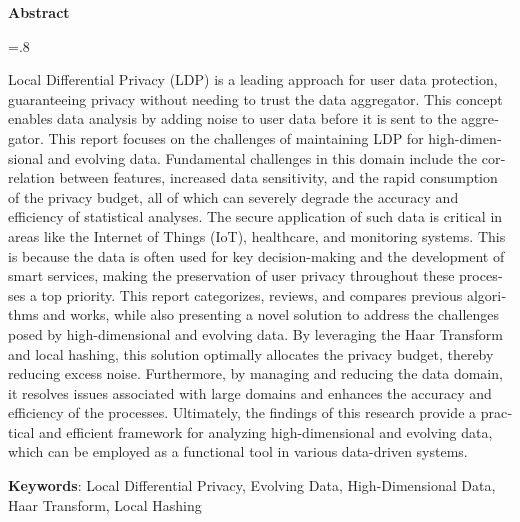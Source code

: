 

\begin{latin}

\begin{center}
\textbf{Abstract}
\end{center}
\baselineskip=.8\baselineskip

Local Differential Privacy (LDP) is a leading approach for user data protection, guaranteeing privacy without needing to trust the data aggregator. This concept enables data analysis by adding noise to user data before it is sent to the aggregator. This report focuses on the challenges of maintaining LDP for high-dimensional and evolving data. Fundamental challenges in this domain include the correlation between features, increased data sensitivity, and the rapid consumption of the privacy budget, all of which can severely degrade the accuracy and efficiency of statistical analyses.
The secure application of such data is critical in areas like the Internet of Things (IoT), healthcare, and monitoring systems. This is because the data is often used for key decision-making and the development of smart services, making the preservation of user privacy throughout these processes a top priority. This report categorizes, reviews, and compares previous algorithms and works, while also presenting a novel solution to address the challenges posed by high-dimensional and evolving data.
By leveraging the Haar Transform and local hashing, this solution optimally allocates the privacy budget, thereby reducing excess noise. Furthermore, by managing and reducing the data domain, it resolves issues associated with large domains and enhances the accuracy and efficiency of the processes. Ultimately, the findings of this research provide a practical and efficient framework for analyzing high-dimensional and evolving data, which can be employed as a functional tool in various data-driven systems.

\bigskip\noindent\textbf{Keywords}:
Local Differential Privacy, Evolving Data, High-Dimensional Data, Haar Transform, Local Hashing

\end{latin}
